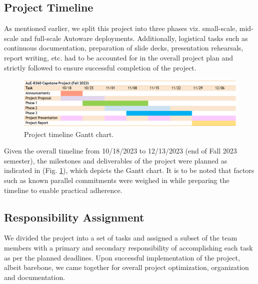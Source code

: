 \hypertarget{Project Timeline}{%
\subsection{Project Timeline}\label{Project Timeline}}

As mentioned earlier, we split this project into three phases viz. small-scale, mid-scale and full-scale Autoware deployments. Additionally, logistical tasks such as continuous documentation, preparation of slide decks, presentation rehearsals, report writing, etc. had to be accounted for in the overall project plan and strictly followed to ensure successful completion of the project.

\begin{figure}[htpb]
    \centering
    \includegraphics[width=\linewidth]{Figures/fig3.png}
    \caption{Project timeline Gantt chart.}
    \label{fig: figure3}
\end{figure}

Given the overall timeline from 10/18/2023 to 12/13/2023 (end of Fall 2023 semester), the milestones and deliverables of the project were planned as indicated in (Fig. \ref{fig: figure3}), which depicts the Gantt chart. It is to be noted that factors such as known parallel commitments were weighed in while preparing the timeline to enable practical adherence.


\hypertarget{Responsibility Assignment}{%
\subsection{Responsibility Assignment}\label{Responsibility Assignment}}

We divided the project into a set of tasks and assigned a subset of the team members with a primary and secondary responsibility of accomplishing each task as per the planned deadlines. Upon successful implementation of the project, albeit barebone, we came together for overall project optimization, organization and documentation.

